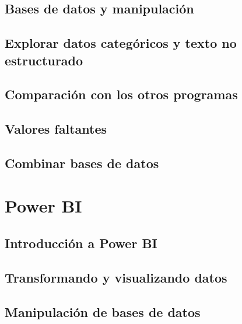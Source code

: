 \documentclass[
]{book}
\begin{document}
\hypertarget{bases-de-datos-y-manipulaciuxf3n}{%
\section{Bases de datos y manipulación}\label{bases-de-datos-y-manipulaciuxf3n}}

\hypertarget{explorar-datos-categuxf3ricos-y-texto-no-estructurado}{%
\section{Explorar datos categóricos y texto no estructurado}\label{explorar-datos-categuxf3ricos-y-texto-no-estructurado}}

\hypertarget{comparaciuxf3n-con-los-otros-programas}{%
\section{Comparación con los otros programas}\label{comparaciuxf3n-con-los-otros-programas}}

\hypertarget{valores-faltantes}{%
\section{Valores faltantes}\label{valores-faltantes}}

\hypertarget{combinar-bases-de-datos}{%
\section{Combinar bases de datos}\label{combinar-bases-de-datos}}

\hypertarget{power-bi}{%
\chapter{Power BI}\label{power-bi}}

\hypertarget{introducciuxf3n-a-power-bi}{%
\section{Introducción a Power BI}\label{introducciuxf3n-a-power-bi}}

\hypertarget{transformando-y-visualizando-datos}{%
\section{Transformando y visualizando datos}\label{transformando-y-visualizando-datos}}

\hypertarget{manipulaciuxf3n-de-bases-de-datos-1}{%
\section{Manipulación de bases de datos}\label{manipulaciuxf3n-de-bases-de-datos-1}}
\end{document}
